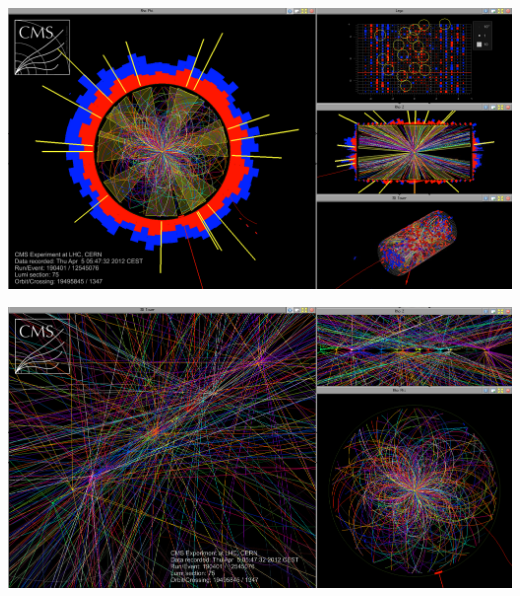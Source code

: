 \begin{frame}[t]
\begin{textblock}{0.48}
    	\includegraphics[width=\textwidth]{images/pileup/cms2012-2.png}
    	\vspace*{0.15cm}

    	\includegraphics[width=\textwidth]{images/pileup/cms2012-3.png}
    \end{textblock}
\end{frame}

